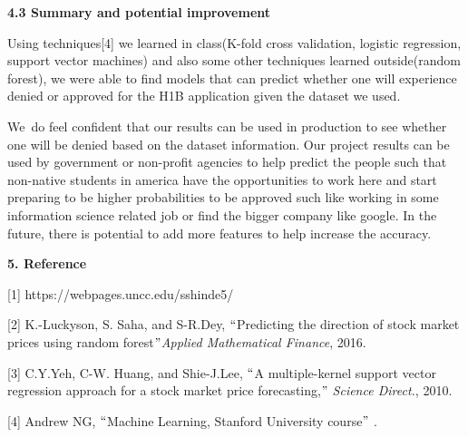 \documentclass[12pt]{article}
\begin{document}
\vspace{\baselineskip}
\begin{justify}
\textbf{4.3 Summary and potential improvement}
\end{justify}\par

\begin{justify}
Using techniques[4] we learned in class(K-fold cross validation, logistic regression, support vector machines) and also some other techniques learned outside(random forest), we were able to find models that can predict whether one will experience denied or approved for the H1B application given the dataset we used. 
\end{justify}\par

\begin{justify}
We\ do feel confident that our results can be used in production to see whether one will be denied based on the dataset information.  Our project results can be used by government or non-profit agencies to help predict the people such that non-native students in america have the opportunities to work here and start preparing to be higher probabilities to be approved such like working in some information science related job or find the bigger company like google. In the future, there is potential to add more features to help increase the accuracy. 
\end{justify}\par


\vspace{\baselineskip}
{\fontsize{14pt}{16.8pt}\selectfont \textbf{5. Reference}\par}\par

\setlength{\parskip}{0.0pt}
[1] https://webpages.uncc.edu/sshinde5/\par

\setlength{\parskip}{12.0pt}
[2] K.-Luckyson, S. Saha, and S-R.Dey, $``$Predicting the direction of stock market prices using random forest$"$  ​\textit{Applied Mathematical Finance}​, 2016.\par

[3] C.Y.Yeh, C-W. Huang, and Shie-J.Lee, $``$A multiple-kernel support vector regression approach for a stock market price forecasting,$"$  ​\textit{Science Direct.},​ 2010.\par

\setlength{\parskip}{0.0pt}
[4] Andrew NG, $``$Machine Learning, Stanford University course$"$ .\par


\printbibliography
\end{document}
